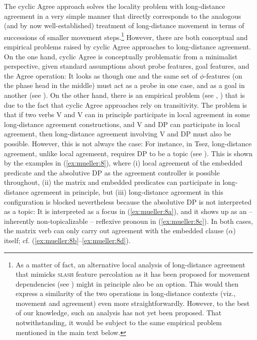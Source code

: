 \documentclass[output=paper
,modfonts
,nonflat]{langsci/langscibook}
\begin{document}
	The cyclic Agree approach solves the locality problem with long-distance\linebreak
	agreement in a very simple manner that directly
	corresponds to the analogous (and by now well-established) treatment
	of long-distance movement in terms of successions of smaller movement
	steps.\footnote{As a matter of fact, an alternative local analysis of long-distance agreement that mimicks {\scshape slash} feature percolation as it has been proposed for movement dependencies (see \citealt{Gazdar:81}) might in principle also be an option. This would then express a similarity of the two operations in long-distance contexts (viz., movement and agreement) even more straightforwardly. However, to the best of our knowledge, such an analysis has not yet been proposed. That notwithstanding, it would be subject to the same empirical problem mentioned in the main text below.}  However, there are both conceptual and empirical problems
	raised by cyclic Agree approaches to long-distance agreement. On the
	one hand, cyclic Agree is conceptually problematic from a minimalist
	perspective, given standard assumptions about probe features, goal
	features, and the Agree operation: It looks as though one and the same
	set of $\phi$-features (on the phase head in the middle) must act as a
	probe in one case, and as a goal in another (see \citealt{Bhatt:05}). On
	the other hand, there is an empirical problem (see
	\citealt{PolinskyPotsdam:01}, \citealt{BhattKeine:16:lon}) that is due to the
	fact that cyclic Agree approaches rely on transitivity. The problem is
	that if two verbs V and V can in principle participate in local
	agreement in some long-distance agreement constructions, and V and
	DP can participate in local agreement, then long-distance
	agreement involving V and DP must also be possible. However,
	this is not always the  case: For instance,  in Tsez, long-distance
	agreement, unlike local agremeent, requires DP to
	be a topic (see \citealt{PolinskyPotsdam:01}). This is shown by the
	examples in (\ref{ex:mueller:8}), where (i) local agreement of the embedded predicate and
	the absolutive DP as the agreement controller is possible throughout,
	(ii) the matrix and embedded predicates can participate in
	long-distance agremeent in principle, but (iii) long-distance
	agreement in this configuration is blocked nevertheless because the
	absolutive DP is not interpreted as a topic: It is interpreted as a
	focus in (\ref{ex:mueller:8a}), and it shows up as an -- inherently
	non-topicalizable -- reflexive pronoun in (\ref{ex:mueller:8c}). In both cases, the
	matrix verb can only carry out agreement with the embedded clause
	($\alpha$) itself; cf. (\ref{ex:mueller:8b}--\ref{ex:mueller:8d}). 
	
\end{document}
